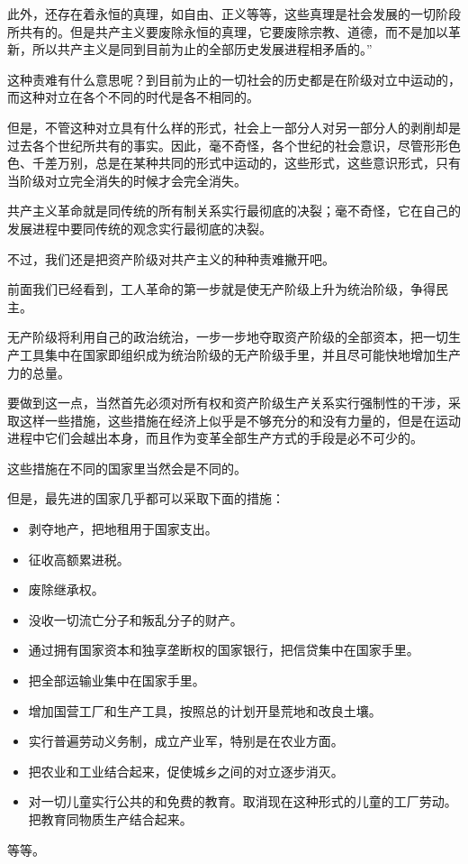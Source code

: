 \documentclass[UTF8]{ctexart}
\begin{document}
此外，还存在着永恒的真理，如自由、正义等等，这些真理是社会发展的一切阶段所共有的。但是共产主义要废除永恒的真理，它要废除宗教、道德，而不是加以革新，所以共产主义是同到目前为止的全部历史发展进程相矛盾的。”

这种责难有什么意思呢？到目前为止的一切社会的历史都是在阶级对立中运动的，而这种对立在各个不同的时代是各不相同的。

但是，不管这种对立具有什么样的形式，社会上一部分人对另一部分人的剥削却是过去各个世纪所共有的事实。因此，毫不奇怪，各个世纪的社会意识，尽管形形色色、千差万别，总是在某种共同的形式中运动的，这些形式，这些意识形式，只有当阶级对立完全消失的时候才会完全消失。

共产主义革命就是同传统的所有制关系实行最彻底的决裂；毫不奇怪，它在自己的发展进程中要同传统的观念实行最彻底的决裂。

不过，我们还是把资产阶级对共产主义的种种责难撇开吧。

前面我们已经看到，工人革命的第一步就是使无产阶级上升为统治阶级，争得民主。

无产阶级将利用自己的政治统治，一步一步地夺取资产阶级的全部资本，把一切生产工具集中在国家即组织成为统治阶级的无产阶级手里，并且尽可能快地增加生产力的总量。

要做到这一点，当然首先必须对所有权和资产阶级生产关系实行强制性的干涉，采取这样一些措施，这些措施在经济上似乎是不够充分的和没有力量的，但是在运动进程中它们会越出本身，而且作为变革全部生产方式的手段是必不可少的。

这些措施在不同的国家里当然会是不同的。

但是，最先进的国家几乎都可以采取下面的措施：

\begin{itemize}
\item 剥夺地产，把地租用于国家支出。

\item 征收高额累进税。

\item 废除继承权。

\item 没收一切流亡分子和叛乱分子的财产。

\item 通过拥有国家资本和独享垄断权的国家银行，把信贷集中在国家手里。

\item 把全部运输业集中在国家手里。

\item 增加国营工厂和生产工具，按照总的计划开垦荒地和改良土壤。

\item 实行普遍劳动义务制，成立产业军，特别是在农业方面。

\item 把农业和工业结合起来，促使城乡之间的对立逐步消灭。

\item 对一切儿童实行公共的和免费的教育。取消现在这种形式的儿童的工厂劳动。把教育同物质生产结合起来。
\end{itemize}
等等。
\end{document}
